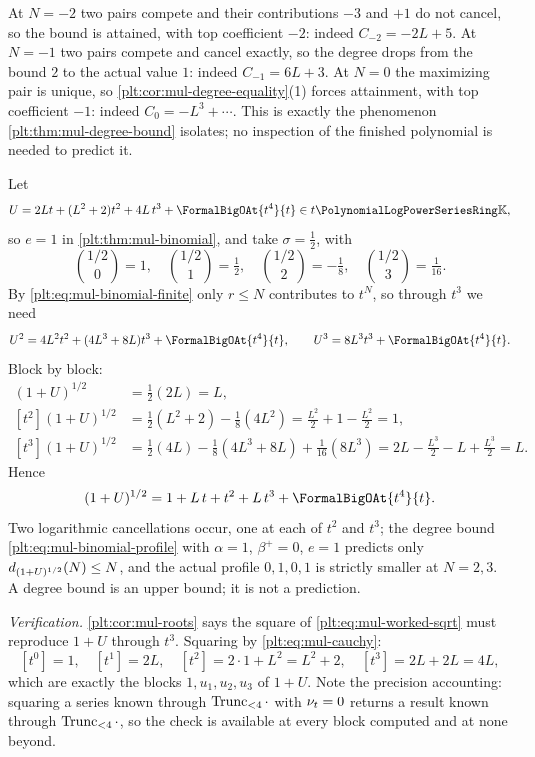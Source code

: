 \begin{example}
At $N=-2$ two pairs compete and their contributions $-3$ and $+1$ do not
cancel, so the bound is attained, with top coefficient $-2$: indeed
$C_{-2}=-2L+5$.  At $N=-1$ two pairs compete and cancel exactly, so the
degree drops from the bound $2$ to the actual value $1$: indeed
$C_{-1}=6L+3$.  At $N=0$ the maximizing pair is unique, so
\cref{plt:cor:mul-degree-equality}(1) forces attainment, with top
coefficient $-1$: indeed $C_0=-L^3+\cdots$.  This is exactly the phenomenon
\cref{plt:thm:mul-degree-bound} isolates; no inspection of the finished
polynomial is needed to predict it.
\end{example}

\begin{example}
\label{plt:ex:mul-worked-sqrt}
Let
\[
 U=2Lt+(L^2+2)t^2+4L\,t^3+\FormalBigOAt{t^{4}}{t}\in t\PLpow,
\]
so $e=1$ in \cref{plt:thm:mul-binomial}, and take $\sigma=\tfrac12$, with
\[
 \binom{1/2}{0}=1,\quad
 \binom{1/2}{1}=\tfrac12,\quad
 \binom{1/2}{2}=-\tfrac18,\quad
 \binom{1/2}{3}=\tfrac1{16}.
\]
By \eqref{plt:eq:mul-binomial-finite} only $r\le N$ contributes to $t^N$, so
through $t^3$ we need
\[
 U^2=4L^2t^2+(4L^3+8L)t^3+\FormalBigOAt{t^{4}}{t},
 \qquad
 U^3=8L^3t^3+\FormalBigOAt{t^{4}}{t}.
\]
Block by block:
\begin{align*}
 [t^1](1+U)^{1/2}&=\tfrac12(2L)=L,\\
 [t^2](1+U)^{1/2}&=\tfrac12(L^2+2)-\tfrac18(4L^2)
   =\tfrac{L^2}2+1-\tfrac{L^2}2=1,\\
 [t^3](1+U)^{1/2}&=\tfrac12(4L)-\tfrac18(4L^3+8L)+\tfrac1{16}(8L^3)
   =2L-\tfrac{L^3}2-L+\tfrac{L^3}2=L .
\end{align*}
Hence
\begin{equation}\label{plt:eq:mul-worked-sqrt}
 (1+U)^{1/2}=1+L\,t+t^2+L\,t^3+\FormalBigOAt{t^{4}}{t}.
\end{equation}
Two logarithmic cancellations occur, one at each of $t^2$ and $t^3$; the
degree bound \eqref{plt:eq:mul-binomial-profile} with $\alpha=1$,
$\beta^{+}=0$, $e=1$ predicts only $d_{(1+U)^{1/2}}(N)\le N$, and the
actual
profile $0,1,0,1$ is strictly smaller at $N=2,3$.  A degree bound is an upper
bound; it is not a prediction.

\emph{Verification.}  \cref{plt:cor:mul-roots} says the square of
\eqref{plt:eq:mul-worked-sqrt} must reproduce $1+U$ through $t^3$.  Squaring
by \eqref{plt:eq:mul-cauchy}:
\[
 [t^0]=1,\quad
 [t^1]=2L,\quad
 [t^2]=2\cdot1+L^2=L^2+2,\quad
 [t^3]=2L+2L=4L,
\]
which are exactly the blocks $1,u_1,u_2,u_3$ of $1+U$.  Note the precision
accounting: squaring a series known through $\operatorname{Trunc}_{<4}\cdot$ with
$\nu_{t}=0$ returns a result known through $\operatorname{Trunc}_{<4}\cdot$, so the check is
available at every block computed and at none beyond.
\end{example}

